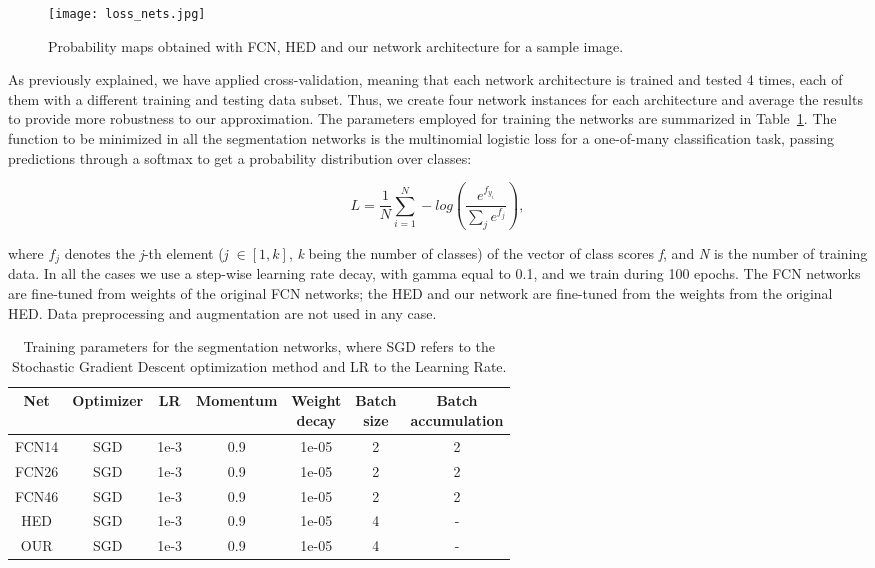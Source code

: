 \documentclass[preprint,authoryear,12pt]{elsarticle}
\begin{document}
\begin{figure}[htb]
\centering
\texttt{[image: loss\_nets.jpg]}
\caption{\label{fig:loss}Probability maps obtained with FCN, HED and our network architecture for a sample image.}
\end{figure}

As previously explained, we have applied cross-validation, meaning that each network architecture is trained and tested 4 times, each of them with a different training and testing data subset. Thus, we create four network instances for each architecture and average the results to provide more robustness to our approximation. The parameters employed for training the networks are summarized in Table~\ref{tab:trainingParams}. The function to be minimized in all the segmentation networks is the multinomial logistic loss for a one-of-many classification task, passing predictions through a softmax to get a probability distribution over classes: 

\[L = \frac{1}{N} \sum_{i=1}^{N}-log(\frac{e^{f_{y_{i}}}}{\sum_{j}e^{f_j}}),\]

where \(f_j\) denotes the \textit{j}-th element (\textit{j} $\in [1,k]$, \textit{k} being the number of classes) of the vector of class scores \textit{f}, and \textit{N} is the number of training data.
In all the cases we use a step-wise learning rate decay, with gamma equal to 0.1, and we train during 100 epochs. The FCN networks are fine-tuned from weights of the original FCN networks; the HED and our network are fine-tuned from the weights from the original HED. Data preprocessing and augmentation are not used in any case.

\begin{table}[htb]
\centering
\begin{tabular}{c|c|c|c|c|c|c}
\hline
Net & Optimizer & LR & Momentum & \thead{Weight \\ decay }& \thead{Batch \\ size} & \thead{Batch \\ accumulation} \\
\hline
FCN14 & SGD &  1e-3 & 0.9 & 1e-05 & 2 & 2\\
FCN26 & SGD & 1e-3 & 0.9 & 1e-05 & 2 & 2\\
FCN46 & SGD & 1e-3 & 0.9 & 1e-05 & 2 & 2\\
HED & SGD & 1e-3 & 0.9 & 1e-05 & 4 & -\\
OUR & SGD & 1e-3 & 0.9 & 1e-05 & 4 & -
\end{tabular}
\caption{\label{tab:trainingParams}Training parameters for the segmentation networks, where SGD refers to the Stochastic Gradient Descent optimization method and LR to the Learning Rate.}
\end{table}
\end{document}

